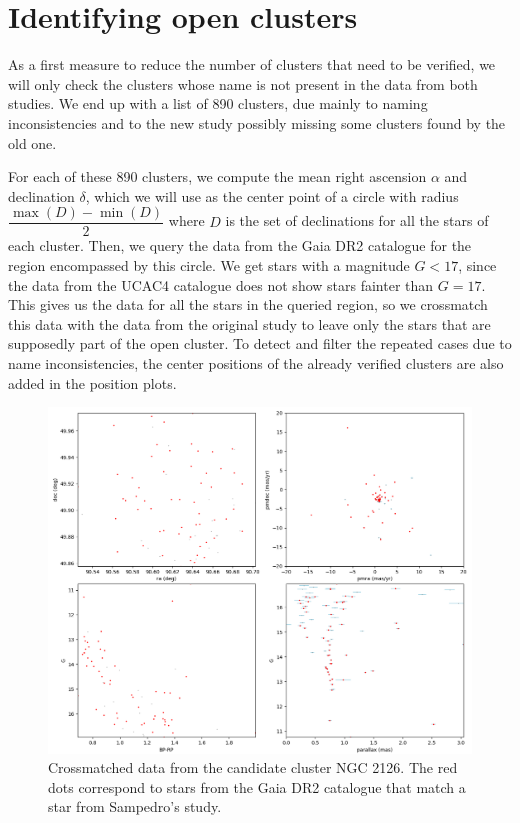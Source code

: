 \documentclass[twocolumn]{revtex4}
\begin{document}
\section{Identifying open clusters}

As a first measure to reduce the number of clusters that need to be verified, we will only check the clusters whose name is not present in the data from both studies. We end up with a list of 890 clusters, due mainly to naming inconsistencies and to the new study possibly missing some clusters found by the old one.

For each of these 890 clusters, we compute the mean right ascension $\alpha$ and declination $\delta$, which we will use as the center point of a circle with radius $\dfrac{\max(D) - \min(D)}{2}$ where $D$ is the set of declinations for all the stars of each cluster. Then, we query the data from the Gaia DR2 catalogue for the region encompassed by this circle. We get stars with a magnitude $G < 17$, since the data from the UCAC4 catalogue does not show stars fainter than $G = 17$. This gives us the data for all the stars in the queried region, so we crossmatch this data with the data from the original study to leave only the stars that are supposedly part of the open cluster. To detect and filter the repeated cases due to name inconsistencies, the center positions of the already verified clusters are also added in the position plots.

\begin{figure}
\centering
\includegraphics[scale=0.5]{NGC_2126_crossmatch}
\caption{Crossmatched data from the candidate cluster NGC 2126. The red dots correspond to stars from the Gaia DR2 catalogue that match a star from Sampedro's study.}
\label{crossmatched_data}
\end{figure}
\end{document}

